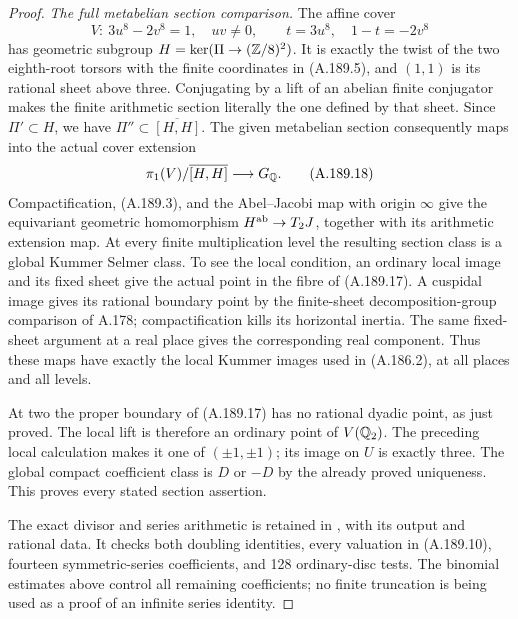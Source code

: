 \begin{proof}
\emph{The full metabelian section comparison.}
The affine cover
\[
 V:\ 3u^8-2v^8=1,\quad uv\ne0,
 \qquad t=3u^8,\quad1-t=-2v^8
\tag{A.189.17}
\]
has geometric subgroup
\(H=\ker(\Pi\to(\mathbb Z/8)^2)\).
It is exactly the twist of the two eighth-root
torsors with the finite coordinates in
(A.189.5), and \((1,1)\) is its rational
sheet above three.  Conjugating by a lift of
an abelian finite conjugator makes the finite
arithmetic section literally the one defined
by that sheet.  Since \(\Pi'\subset H\),
we have \(\Pi''\subset\overline{[H,H]}\).
The given metabelian section consequently
maps into the actual cover extension
\[
 \pi_1(V)/\overline{[H,H]}\longrightarrow G_\mathbb Q.
\tag{A.189.18}
\]
Compactification, (A.189.3), and the
Abel--Jacobi map with origin \(\infty\)
give the equivariant geometric homomorphism
\(H^{\rm ab}\to T_2J\), together with
its arithmetic extension map.  At every
finite multiplication level the resulting
section class is a global Kummer Selmer
class.  To see the local condition, an
ordinary local image and its fixed sheet
give the actual point in the fibre of
(A.189.17).  A cuspidal image gives its
rational boundary point by the finite-sheet
decomposition-group comparison of A.178;
compactification kills its horizontal
inertia.  The same fixed-sheet argument
at a real place gives the corresponding
real component.  Thus these maps have
exactly the local Kummer images used in
(A.186.2), at all places and all levels.

At two the proper boundary of (A.189.17)
has no rational dyadic point, as just
proved.  The local lift is therefore an
ordinary point of \(V(\mathbb Q_2)\).
The preceding local calculation makes it
one of \((\pm1,\pm1)\); its image on
\(U\) is exactly three.  The global
compact coefficient class is \(D\) or
\(-D\) by the already proved uniqueness.
This proves every stated section assertion.

The exact divisor and series arithmetic is
retained in
,
with its output and rational data.  It checks
both doubling identities, every valuation in
(A.189.10), fourteen symmetric-series
coefficients, and 128 ordinary-disc tests.
The binomial estimates above control all
remaining coefficients; no finite truncation
is being used as a proof of an infinite
series identity.
\end{proof}
